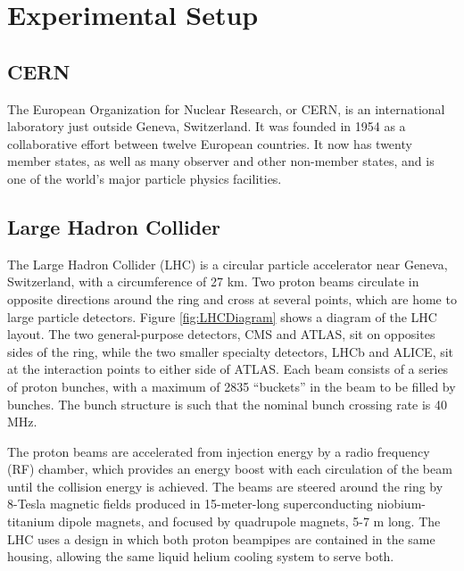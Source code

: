 \chapter{Experimental Setup}
\label{exp}

\section{CERN}
\label{exp:CERN}
The European Organization for Nuclear Research, or CERN, is an
international laboratory just outside Geneva, Switzerland.  
It was founded in 1954 as a collaborative effort between twelve European 
countries.  
It now has twenty member states, as well as many observer 
and other non-member states, and is one of the world's major 
particle physics facilities.  

\section{Large Hadron Collider}
\label{exp:LHC}



The Large Hadron Collider (LHC) \cite{LhcMachine}
is a circular particle accelerator near Geneva, Switzerland, 
with a circumference of 27 km. 
Two proton beams circulate in opposite directions around the ring
and cross at several points, which are home to large particle detectors.  
Figure \ref{fig:LHCDiagram} shows a diagram of the LHC layout.  
The two general-purpose detectors, CMS and ATLAS, sit on opposites sides of the ring, 
while the two smaller specialty detectors, LHCb and ALICE, 
sit at the interaction points to either side of ATLAS.  
Each beam consists of a series of proton bunches, 
with a maximum of 2835 ``buckets'' in the beam to be filled by bunches.  
The bunch structure is such that the nominal bunch crossing rate is 40 MHz.  

The proton beams are accelerated from injection energy by a 
radio frequency (RF) chamber, 
which provides an energy boost with each circulation of the beam
until the collision energy is achieved.  
The beams are steered around the ring by 8-Tesla magnetic fields produced in 
15-meter-long superconducting niobium-titanium dipole magnets,
and focused by quadrupole magnets, 5-7 m long.  
The LHC uses a design in which both proton beampipes are contained in the same housing,
allowing the same liquid helium cooling system to serve both.  

